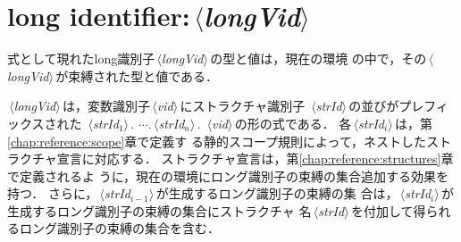 \documentclass{jbook}
\newcommand{\txt}[2]{#2}
\newcommand{\code}[1]{\mbox{\large\tt #1}}
\newcommand{\nonterm}[1]{\mbox{$\,\langle$}{\it #1}\mbox{$\rangle\,$}}
\newenvironment{program}{\begin{quote}\begin{tt}}%
                        {\end{tt}\end{quote}}
\begin{document}
% 
% 


\section{\txt{long識別子}{long identifier}:\nonterm{longVid}}

\ifjp%
	式として現れたlong識別子\nonterm{longVid}の型と値は，現在の環境
の中で，その\nonterm{longVid}が束縛された型と値である．

	\nonterm{longVid}は，変数識別子\nonterm{vid}にストラクチャ識別子
\nonterm{strId}の並びがプレフィックスされた
\nonterm{strId$_1$}. $\cdots$.\nonterm{strId$_n$}. \nonterm{vid}の形の式である．
	各\nonterm{strId$_i$}は，第\ref{chap:reference:scope}章で定義す
る静的スコープ規則によって，ネストしたストラクチャ宣言に対応する．
	ストラクチャ宣言は，第\ref{chap:reference:structures}章で定義されるよ
うに，現在の環境にロング識別子の束縛の集合追加する効果を持つ．
	さらに，\nonterm{strId$_{i-1}$}が生成するロング識別子の束縛の集
合は，\nonterm{strId$_i$}が生成するロング識別子の束縛の集合にストラクチャ
名\nonterm{strId}を付加して得られるロング識別子の束縛の集合を含む．
\end{document}
